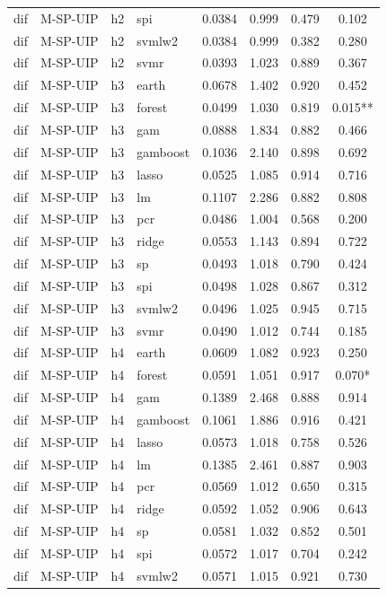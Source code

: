 \begin{ThreePartTable}
\begin{longtable}[t]{llclcccc}
dif & M-SP-UIP & h2 & spi & 0.0384 & 0.999 & 0.479 & 0.102\\
dif & M-SP-UIP & h2 & svmlw2 & 0.0384 & 0.999 & 0.382 & 0.280\\
dif & M-SP-UIP & h2 & svmr & 0.0393 & 1.023 & 0.889 & 0.367\\
\addlinespace
dif & M-SP-UIP & h3 & earth & 0.0678 & 1.402 & 0.920 & 0.452\\
dif & M-SP-UIP & h3 & forest & 0.0499 & 1.030 & 0.819 & 0.015**\\
dif & M-SP-UIP & h3 & gam & 0.0888 & 1.834 & 0.882 & 0.466\\
dif & M-SP-UIP & h3 & gamboost & 0.1036 & 2.140 & 0.898 & 0.692\\
dif & M-SP-UIP & h3 & lasso & 0.0525 & 1.085 & 0.914 & 0.716\\
dif & M-SP-UIP & h3 & lm & 0.1107 & 2.286 & 0.882 & 0.808\\
dif & M-SP-UIP & h3 & pcr & 0.0486 & 1.004 & 0.568 & 0.200\\
dif & M-SP-UIP & h3 & ridge & 0.0553 & 1.143 & 0.894 & 0.722\\
dif & M-SP-UIP & h3 & sp & 0.0493 & 1.018 & 0.790 & 0.424\\
dif & M-SP-UIP & h3 & spi & 0.0498 & 1.028 & 0.867 & 0.312\\
dif & M-SP-UIP & h3 & svmlw2 & 0.0496 & 1.025 & 0.945 & 0.715\\
dif & M-SP-UIP & h3 & svmr & 0.0490 & 1.012 & 0.744 & 0.185\\
\addlinespace
dif & M-SP-UIP & h4 & earth & 0.0609 & 1.082 & 0.923 & 0.250\\
dif & M-SP-UIP & h4 & forest & 0.0591 & 1.051 & 0.917 & 0.070*\\
dif & M-SP-UIP & h4 & gam & 0.1389 & 2.468 & 0.888 & 0.914\\
dif & M-SP-UIP & h4 & gamboost & 0.1061 & 1.886 & 0.916 & 0.421\\
dif & M-SP-UIP & h4 & lasso & 0.0573 & 1.018 & 0.758 & 0.526\\
dif & M-SP-UIP & h4 & lm & 0.1385 & 2.461 & 0.887 & 0.903\\
dif & M-SP-UIP & h4 & pcr & 0.0569 & 1.012 & 0.650 & 0.315\\
dif & M-SP-UIP & h4 & ridge & 0.0592 & 1.052 & 0.906 & 0.643\\
dif & M-SP-UIP & h4 & sp & 0.0581 & 1.032 & 0.852 & 0.501\\
dif & M-SP-UIP & h4 & spi & 0.0572 & 1.017 & 0.704 & 0.242\\
dif & M-SP-UIP & h4 & svmlw2 & 0.0571 & 1.015 & 0.921 & 0.730\\

\end{longtable}
\end{ThreePartTable}
